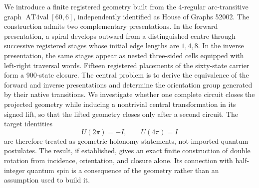 We introduce a finite registered geometry built from the 4-regular
arc-transitive graph \(\operatorname{AT4val}[60,6]\), independently
identified as House of Graphs 52002. The construction admits two
complementary presentations. In the forward presentation, a spiral
develops outward from a distinguished centre through successive
registered stages whose initial edge lengths are \(1,4,8\). In the
inverse presentation, the same stages appear as nested three-sided cells
equipped with left-right traversal words. Fifteen registered placements
of the sixty-state carrier form a 900-state closure. The central problem
is to derive the equivalence of the forward and inverse presentations
and determine the orientation group generated by their native
transitions. We investigate whether one complete circuit closes the
projected geometry while inducing a nontrivial central transformation in
its signed lift, so that the lifted geometry closes only after a second
circuit. The target identities
\[
U(2\pi)=-I,\qquad U(4\pi)=I
\]
are therefore treated as geometric holonomy statements, not imported
quantum postulates. The result, if established, gives an exact finite
construction of double rotation from incidence, orientation, and closure
alone. Its connection with half-integer quantum spin is a consequence of
the geometry rather than an assumption used to build it.
